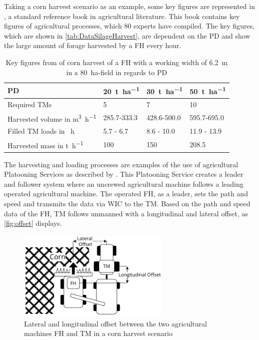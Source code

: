 Taking a corn harvest scenario as an example, some key figures are represented in \cite{faustzahlen2018}, a standard reference book in agricultural literature. This book contains key figures of agricultural processes, which 80 experts have compiled.
The key figures, which are shown in \autoref{tab:DataSilageHarvest}, are dependent on the \ac{PD} and show the large amount of forage harvested by a \ac{FH} every hour.
\begin{table}[H]
	\centering
	\begin{tabular}{>{\raggedright}p{4.9cm}p{1.8cm}p{1.8cm}p{1.8cm}}
		\toprule
  		\acf{PD}&\SI{20}{\tonne\per\hectare}&\SI{30}{\tonne\per\hectare} & \SI{50}{\tonne\per\hectare}\\
		\midrule
		Required \acl{TM}s & \num{5}&
		\num{7} & \num{10} \\
		Harvested volume in \si{\cubic\metre\per\hour} &
		\num{285.7}-\num{333.3}
		& \num{428.6}-\num{500.0} &
		\num{595.7}-\num{695.0}\\
		Filled \acl{TM} loads in \si{\per\hour} &
		\num{5.7} - \num{6.7}
		& \num{8.6} - \num{10.0} &
		\num{11.9} - \num{13.9}\\
		Harvested mass in \si{\tonne\per\hour} & \num{100}
		& \num{150} &
		\num{208.5} \\
		\bottomrule
	\end{tabular}
	\caption{Key figures from \cite{faustzahlen2018} of corn harvest of a \acf{FH} with a working width of \SI{6.2}{\metre} in a \SI{80}{\hectare}-field in regards to \acf{PD}}
	\label{tab:DataSilageHarvest}
\end{table}

The harvesting and loading processes are examples of the use of agricultural Platooning Services as described by
\textcite{zhang_method_2009}.
This Platooning Service creates a leader and follower system where an uncrewed agricultural machine follows a leading operated agricultural machine.
The operated \ac{FH}, as a leader, sets the path and speed and transmits the data via \ac{WIC} to the \ac{TM}. Based on the path and speed data of the \ac{FH}, \ac{TM} follows unmanned with a longitudinal and lateral offset, as \autoref{fig:offset} displays.
\begin{figure}[H]
	\centering
	\includegraphics[width=0.65\textwidth]{figures/offset_platoon.pdf}
	\caption{Lateral and longitudinal offset between the two agricultural machines \acf{FH} and \acf{TM} in a corn harvest scenario}%
	\label{fig:offset}%
\end{figure}

